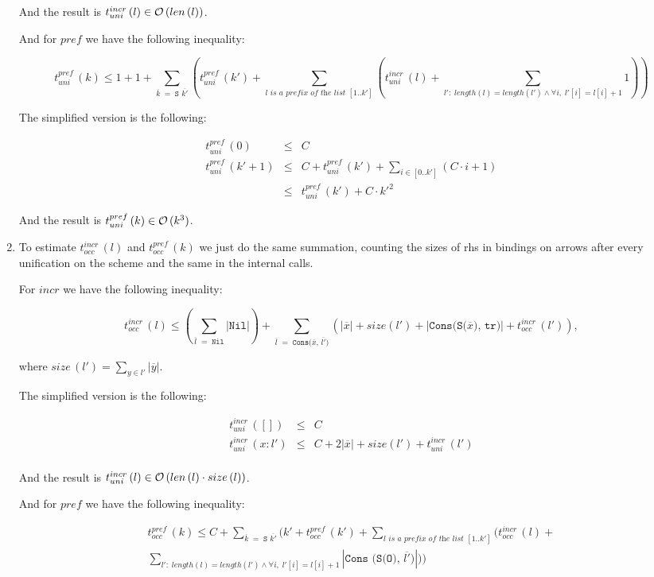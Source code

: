 \begin{enumerate}
And the result is $t_{uni}^{incr}\,(l) \in \mathcal{O}\,(len\,(l))$.

And for $pref$ we have the following inequality:

  \[
    t_{uni}^{pref}\,(k) \le 1 + 1 + \sum_{\overline{k} \;=\; \texttt{S $\overline{k'}$}} (t_{uni}^{pref}\,(k') + \sum_{\textit{$l$ is a prefix of the list $[1..k']$}} (t_{uni}^{incr}\,(l) + \sum_{l': \; length(l) = length(l') \land \forall i, \; l'[i] = l[i] + 1} 1))
    \]

The simplified version is the following:

\[ \begin{array}{rcl}
t_{uni}^{pref}\,(0) &\le& C \\
t_{uni}^{pref}\,(k' + 1) &\le& C + t_{uni}^{pref}\,(k') + \sum_{i \in [0..k']} (C \cdot i + 1) \\
&\le& t_{uni}^{pref}\,(k') + C \cdot k'^2
\end{array} \]

And the result is $t_{uni}^{pref}\,(k) \in \mathcal{O}\,(k^3)$.

\item To estimate $t_{occ}^{incr}\,(l)$ and $t_{occ}^{pref}\,(k)$ we just do the same summation, counting the sizes of rhs in bindings on arrows after every unification on the scheme and the same in the internal calls.

For $incr$ we have the following inequality:

\[ t_{occ}^{incr}\,(l) \le (\sum_{\overline{l} \;=\; \texttt{Nil}} |\texttt{Nil}|) + \sum_{\overline{l} \;=\; \texttt{Cons($\overline{x}$, $\overline{l'}$)}} (|\overline{x}| + size(l') + |\texttt{Cons(S($\overline{x}$), tr)}| + t_{occ}^{incr}\,(l') ), \]

where $size\,(l') = \sum_{y \in l'} |\overline{y}|$.

The simplified version is the following:

\[ \begin{array}{lcl}
t_{uni}^{incr}\,([]) &\le& C \\
t_{uni}^{incr}\,(x : l') &\le& C + 2 |\overline{x}| + size(l') + t_{uni}^{incr}\,(l') \\
\end{array} \]

And the result is $t_{uni}^{incr}\,(l) \in \mathcal{O}\,(len\,(l) \cdot size\,(l))$.

And for $pref$ we have the following inequality:

\[ \begin{array}{c} t_{occ}^{pref}\,(k) \le C + \sum_{\overline{k} \;=\; \texttt{S $\overline{k'}$}} (k' + t_{occ}^{pref}\,(k') + \sum_{\textit{$l$ is a prefix of the list $[1..k']$}} (t_{occ}^{incr}\,(l) + \\ \sum_{l': \; length(l) = length(l') \land \forall i, \; l'[i] = l[i] + 1} |\texttt{Cons (S(O), $\overline{l'}$)}|)) \end{array}  \]


\end{enumerate}
